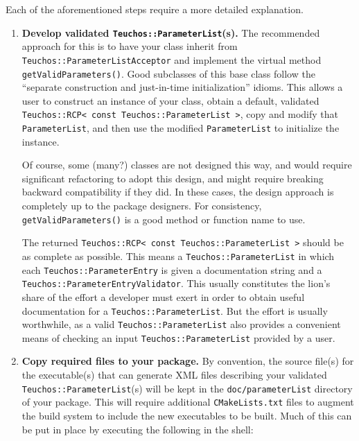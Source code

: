 \documentclass[pdf,ps2pdf,12pt]{smemo}
\begin{document}
\begin{memo}
Each of the aforementioned steps require a more detailed explanation.

\begin{enumerate}

\item \textbf{Develop validated \texttt{Teuchos::ParameterList}(s).}
  The recommended approach for this is to have your class inherit from
  \texttt{Teuchos::ParameterListAcceptor} and implement the virtual
  method \texttt{getValidParameters()}.  Good subclasses of this base
  class follow the ``separate construction and just-in-time
  initialization'' idioms.  This allows a user to construct an
  instance of your class, obtain a default, validated
  \texttt{Teuchos::RCP< const Teuchos::ParameterList >}, copy and
  modify that \texttt{ParameterList}, and then use the modified
  \texttt{ParameterList} to initialize the instance.

  Of course, some (many?) classes are not designed this way, and would
  require significant refactoring to adopt this design, and might
  require breaking backward compatibility if they did.  In these
  cases, the design approach is completely up to the package
  designers.  For consistency, \texttt{getValidParameters()} is a good
  method or function name to use.

  The returned \texttt{Teuchos::RCP< const Teuchos::ParameterList >}
  should be as complete as possible.  This means a
  \texttt{Teuchos::ParameterList} in which each
  \texttt{Teuchos::Pa\-ra\-met\-er\-En\-try} is given a documentation
  string and a
  \texttt{Teuchos::Pa\-ra\-me\-ter\-En\-try\-Val\-i\-da\-tor}. This
  usually constitutes the lion's share of the effort a developer must
  exert in order to obtain useful documentation for a
  \texttt{Teuchos::ParameterList}.  But the effort is usually
  worthwhile, as a valid \texttt{Teuchos::ParameterList} also provides
  a convenient means of checking an input
  \texttt{Teuchos::ParameterList} provided by a user.

\item \textbf{Copy required files to your package.} By convention, the
  source file(s) for the executable(s) that can generate XML files
  describing your validated \texttt{Teuchos::Pa\-ra\-me\-ter\-List}(s)
  will be kept in the \texttt{doc/parameterList} directory of your
  package. This will require additional \texttt{CMakeLists.txt} files
  to augment the build system to include the new executables to be
  built. Much of this can be put in place by executing the following
  in the shell:


\end{enumerate}
\end{memo}
\end{document}
